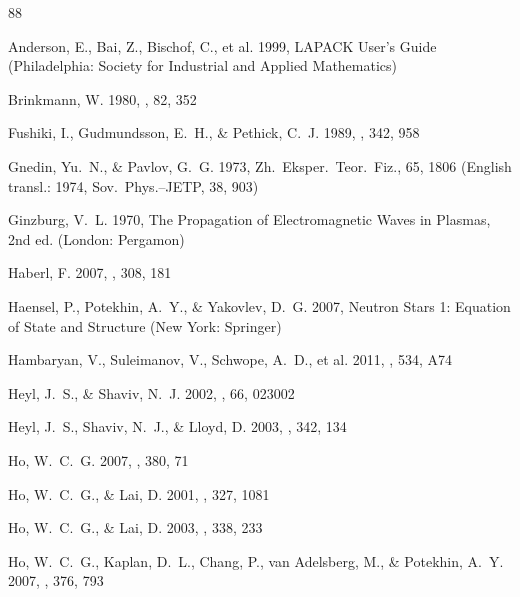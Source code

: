 \documentclass{aa}
\begin{document}
\begin{thebibliography}{88}

Anderson, E., Bai, Z., Bischof, C., et al.
1999, 
LAPACK User's Guide 
(Philadelphia: Society for Industrial and Applied Mathematics)

Brinkmann, W. 
1980, 
\aap, 82, 352

Fushiki, I., Gudmundsson,  E.~H., \& Pethick, C.~J.
1989,
\apj, 342, 958

Gnedin, Yu.~N., \& Pavlov, G.~G.
1973,
Zh.\ Eksper.\ Teor.\ Fiz., 65, 1806
(English transl.: 1974, Sov.\ Phys.--JETP, 38, 903)

Ginzburg, V.~L.
1970,
The Propagation of Electromagnetic Waves in Plasmas,
2nd ed. (London: Pergamon)

Haberl, F.
2007, 
 \apss, {308}, 181%
 
 Haensel, P., Potekhin, A.~Y., \& Yakovlev, D.~G.
 2007,
Neutron Stars 1: Equation of State and Structure
(New York: Springer)

Hambaryan, V., Suleimanov, V., Schwope, A.~D., et al.
2011,
\aap, 534, A74

Heyl, J.~S., \& Shaviv, N.~J.
2002,
\prd, 66, 023002

Heyl, J.~S., Shaviv, N.~J., \& Lloyd, D.
2003,
\mnras, 342, 134

Ho, W.~C.~G.
2007,
\mnras, 380, 71

Ho, W.~C.~G., \& Lai, D.
 2001,
\mnras, 327, 1081

Ho, W.~C.~G., \& Lai, D.
 2003,
\mnras, 338, 233

Ho, W.~C.~G., Kaplan, D.~L., Chang, P., van Adelsberg, M., \& Potekhin, A.~Y.
 2007,
\mnras, 376, 793


\end{thebibliography}
\end{document}
